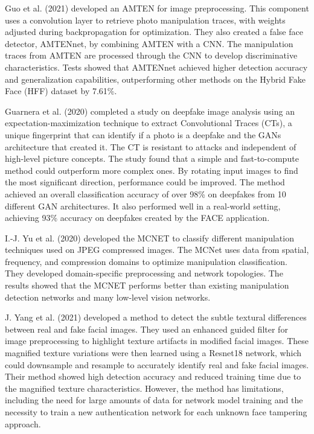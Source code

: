 Guo et al. (2021)\cite{guo2021fake} developed an AMTEN for image preprocessing. This component uses a convolution layer to retrieve photo manipulation traces, with weights adjusted during backpropagation for optimization. They also created a false face detector, AMTENnet, by combining AMTEN with a CNN. The manipulation traces from AMTEN are processed through the CNN to develop discriminative characteristics. Tests showed that AMTENnet achieved higher detection accuracy and generalization capabilities, outperforming other methods on the Hybrid Fake Face (HFF) dataset\cite{AMTEN} by 7.61\%.

Guarnera et al. (2020)\cite{guarnera2020fighting} completed a study on deepfake image analysis using an expectation-maximization technique to extract Convolutional Traces (CTs), a unique fingerprint that can identify if a photo is a deepfake and the GANs architecture that created it. The CT is resistant to attacks and independent of high-level picture concepts. The study found that a simple and fast-to-compute method could outperform more complex ones. By rotating input images to find the most significant direction, performance could be improved. The method achieved an overall classification accuracy of over 98\% on deepfakes from 10 different GAN architectures. It also performed well in a real-world setting, achieving 93\% accuracy on deepfakes created by the FACE application.

I.-J. Yu et al. (2020)\cite{yu2020manipulation} developed the MCNET to classify different manipulation techniques used on JPEG compressed images. The MCNet uses data from spatial, frequency, and compression domains to optimize manipulation classification. They developed domain-specific preprocessing and network topologies. The results showed that the MCNET performs better than existing manipulation detection networks and many low-level vision networks.

J. Yang et al. (2021)\cite{yang2021detecting} developed a method to detect the subtle textural differences between real and fake facial images. They used an enhanced guided filter for image preprocessing to highlight texture artifacts in modified facial images. These magnified texture variations were then learned using a Resnet18 network, which could downsample and resample to accurately identify real and fake facial images. Their method showed high detection accuracy and reduced training time due to the magnified texture characteristics. However, the method has limitations, including the need for large amounts of data for network model training and the necessity to train a new authentication network for each unknown face tampering approach.


